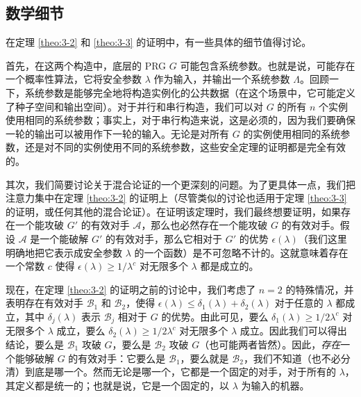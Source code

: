\subsection{数学细节}

在定理 \ref{theo:3-2} 和 \ref{theo:3-3} 的证明中，有一些具体的细节值得讨论。

首先，在这两个构造中，底层的 PRG $G$ 可能包含系统参数。也就是说，可能存在一个概率性算法，它将安全参数 $\lambda$ 作为输入，并输出一个系统参数 $\Lambda$。回顾一下，系统参数是能够完全地将构造实例化的公共数据（在这个场景中，它可能定义了种子空间和输出空间）。对于并行和串行构造，我们可以对 $G$ 的所有 $n$ 个实例使用相同的系统参数；事实上，对于串行构造来说，这是必须的，因为我们要确保一轮的输出可以被用作下一轮的输入。无论是对所有 $G$ 的实例使用相同的系统参数，还是对不同的实例使用不同的系统参数，这些安全定理的证明都是完全有效的。

其次，我们简要讨论关于混合论证的一个更深刻的问题。为了更具体一点，我们把注意力集中在定理 \ref{theo:3-2} 的证明上（尽管类似的讨论也适用于定理 \ref{theo:3-3} 的证明，或任何其他的混合论证）。在证明该定理时，我们最终想要证明，如果存在一个能攻破 $G'$ 的有效对手 $\mathcal A$，那么也必然存在一个能攻破 $G$ 的有效对手。假设 $\mathcal A$ 是一个能破解 $G'$ 的有效对手，那么它相对于 $G'$ 的优势 $\epsilon(\lambda)$（我们这里明确地把它表示成安全参数 $\lambda$ 的一个函数）是不可忽略不计的。这就意味着存在一个常数 $c$ 使得 $\epsilon(\lambda)\geq{1}/{\lambda^c}$ 对无限多个 $\lambda$ 都是成立的。

现在，在定理 \ref{theo:3-2} 的证明之前的讨论中，我们考虑了 $n=2$ 的特殊情况，并表明存在有效对手 $\mathcal{B}_1$ 和 $\mathcal{B}_2$，使得 $\epsilon(\lambda)\leq\delta_1(\lambda)+\delta_2(\lambda)$ 对于任意的 $\lambda$ 都成立，其中 $\delta_j(\lambda)$ 表示 $\mathcal{B}_j$ 相对于 $G$ 的优势。由此可见，要么 $\delta_1(\lambda)\geq{1}/{2\lambda^c}$ 对无限多个 $\lambda$ 成立，要么 $\delta_2(\lambda)\geq{1}/{2\lambda^c}$ 对无限多个 $\lambda$ 成立。因此我们可以得出结论，要么是 $\mathcal{B}_1$ 攻破 $G$，要么是 $\mathcal{B}_2$ 攻破 $G$（也可能两者皆然）。因此，\emph{存在}一个能够破解 $G$ 的有效对手：它要么是 $\mathcal{B}_1$，要么就是 $\mathcal{B}_2$，我们不知道（也不必分清）到底是哪一个。然而无论是哪一个，它都是一个固定的对手，对于所有的 $\lambda$，其定义都是统一的；也就是说，它是一个固定的，以 $\lambda$ 为输入的机器。

